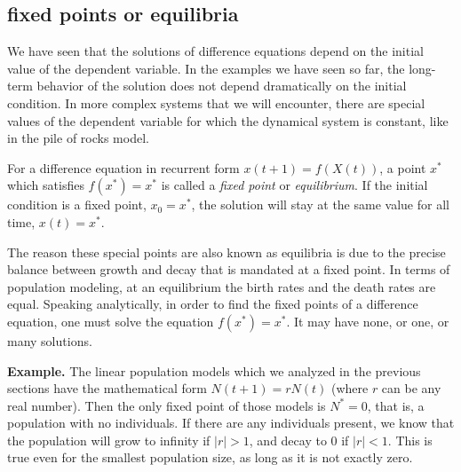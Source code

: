 \documentclass[
  letterpaper,
  DIV=11,
  numbers=noendperiod]{scrreprt}
\begin{document}
\hypertarget{fixed-points-or-equilibria}{%
\subsection{fixed points or
equilibria}\label{fixed-points-or-equilibria}}

We have seen that the solutions of difference equations depend on the
initial value of the dependent variable. In the examples we have seen so
far, the long-term behavior of the solution does not depend dramatically
on the initial condition. In more complex systems that we will
encounter, there are special values of the dependent variable for which
the dynamical system is constant, like in the pile of rocks model.

\begin{tcolorbox}[enhanced jigsaw, colbacktitle=quarto-callout-note-color!10!white, leftrule=.75mm, coltitle=black, left=2mm, breakable, opacityback=0, colback=white, toprule=.15mm, opacitybacktitle=0.6, bottomtitle=1mm, colframe=quarto-callout-note-color-frame, rightrule=.15mm, bottomrule=.15mm, toptitle=1mm, titlerule=0mm, arc=.35mm, title=\textcolor{quarto-callout-note-color}{\faInfo}\hspace{0.5em}{Definition}]
For a difference equation in recurrent form \(x(t+1) = f(X(t))\), a
point \(x^*\) which satisfies \(f(x^*)=x^*\) is called a \emph{fixed
point} or \emph{equilibrium}. If the initial condition is a fixed point,
\(x_0=x^*\), the solution will stay at the same value for all time,
\(x(t)=x^*\).
\end{tcolorbox}

The reason these special points are also known as equilibria is due to
the precise balance between growth and decay that is mandated at a fixed
point. In terms of population modeling, at an equilibrium the birth
rates and the death rates are equal. Speaking analytically, in order to
find the fixed points of a difference equation, one must solve the
equation \(f(x^*) = x^*\). It may have none, or one, or many solutions.

\textbf{Example.} The linear population models which we analyzed in the
previous sections have the mathematical form \(N(t+1)= r N(t)\) (where
\(r\) can be any real number). Then the only fixed point of those models
is \(N^* = 0\), that is, a population with no individuals. If there are
any individuals present, we know that the population will grow to
infinity if \(|r| > 1\), and decay to 0 if \(|r| < 1\). This is true
even for the smallest population size, as long as it is not exactly
zero.
\end{document}
